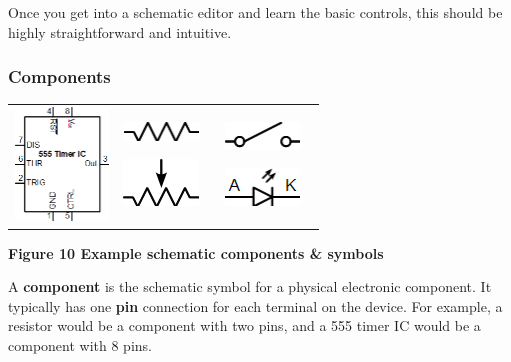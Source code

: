 \documentclass[letterpaper]{article}
\begin{document}
{\sffamily\color[rgb]{0.30980393,0.5058824,0.7411765}
Once you get into a schematic editor and learn the basic controls, this should be highly straightforward and intuitive.}


\bigskip

\subsubsection{Components}
\hypertarget{Toc337742678}{}\begin{flushleft}
\tablefirsthead{}
\tablehead{}
\tabletail{}
\tablelasttail{}
\begin{supertabular}{m{2.4254599in}m{2.41916in}m{2.41916in}}
 \includegraphics[width=0.9839in,height=1.1811in]{figures/ee4document-img004.png}  &
 \includegraphics[width=0.7874in,height=0.1965in]{figures/ee4document-img005.png} 
~

 \includegraphics[width=0.7874in,height=0.4866in]{figures/ee4document-img006.png}  &
 \includegraphics[width=0.7874in,height=0.289in]{figures/ee4document-img007.png} 
~

 \includegraphics[width=0.7874in,height=0.3937in]{figures/ee4document-img008.png} 
~
\\
\end{supertabular}
\end{flushleft}
{\sffamily\color[rgb]{0.30980393,0.5058824,0.7411765}
\textbf{Figure 10 Example schematic components \& symbols}}


\bigskip

{\sffamily\color[rgb]{0.30980393,0.5058824,0.7411765}
A \textbf{component} is the schematic symbol for a physical electronic component. It typically has one \textbf{pin}
connection for each terminal on the device. For example, a resistor would be a component with two pins, and a 555 timer
IC would be a component with 8 pins.}
\end{document}
